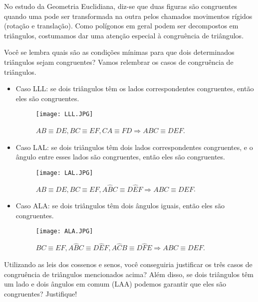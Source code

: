 \begin{reflection}
 
No estudo da Geometria Euclidiana, diz-se que duas figuras são congruentes quando uma pode ser transformada na outra pelos chamados movimentos rígidos (rotação e translação). Como polígonos em geral podem ser decompostos em triângulos, costumamos dar uma atenção especial à congruência de triângulos. 

Você se lembra quais são as condições mínimas para que dois determinados triângulos sejam congruentes? Vamos relembrar os casos de congruência de triângulos. 
\begin{itemize}
    \item Caso LLL: se dois triângulos têm os lados correspondentes congruentes, então eles são congruentes.
    \begin{figure}[H]
    \centering
   \texttt{[image: LLL.JPG]}
    \caption{$AB \equiv DE, BC\equiv EF, CA \equiv FD \Rightarrow ABC \equiv DEF$.}
    \label{LLL}
    \end{figure}
    
    \item Caso LAL: se dois triângulos têm dois lados correspondentes congruentes, e o ângulo entre esses lados são congruentes, então eles são congruentes.
    \begin{figure}[H]
    \centering
   \texttt{[image: LAL.JPG]}
    \caption{$AB \equiv DE, BC\equiv EF, A\hat{B}C \equiv D\hat{E}F \Rightarrow ABC \equiv DEF$.}
    \label{LAL}
    \end{figure}
    
    \item Caso ALA: se dois triângulos têm dois ângulos iguais, então eles são congruentes.
    \begin{figure}[H]
    \centering
   \texttt{[image: ALA.JPG]}
    \caption{ $BC\equiv EF, A\hat{B}C \equiv D\hat{E}F, A\hat{C}B \equiv D\hat{F}E  \Rightarrow ABC \equiv DEF$.}
    \label{ALA}
    \end{figure}
\end{itemize}
Utilizando as leis dos cossenos e senos, você conseguiria justificar os três casos de congruência de triângulos mencionados acima? Além disso, se dois triângulos têm um lado e dois ângulos em comum (LAA) podemos garantir que eles são congruentes? Justifique!
\end{reflection}




